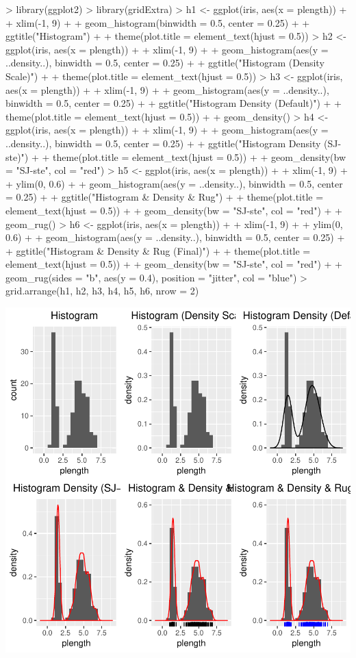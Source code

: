 \begin{Schunk}
\begin{Sinput}
> library(ggplot2)
> library(gridExtra)
> h1 <- ggplot(iris, aes(x = plength)) +
+   xlim(-1, 9) +
+   geom_histogram(binwidth = 0.5, center = 0.25) +
+   ggtitle("Histogram") +
+   theme(plot.title = element_text(hjust = 0.5))
> h2 <- ggplot(iris, aes(x = plength)) +
+   xlim(-1, 9) +
+   geom_histogram(aes(y = ..density..), binwidth = 0.5, center = 0.25) +
+   ggtitle("Histogram (Density Scale)") +
+   theme(plot.title = element_text(hjust = 0.5))
> h3 <- ggplot(iris, aes(x = plength)) +
+   xlim(-1, 9) +
+   geom_histogram(aes(y = ..density..), binwidth = 0.5, center = 0.25) +
+   ggtitle("Histogram Density (Default)") +
+   theme(plot.title = element_text(hjust = 0.5)) +
+   geom_density()
> h4 <- ggplot(iris, aes(x = plength)) +
+   xlim(-1, 9) +
+   geom_histogram(aes(y = ..density..), binwidth = 0.5, center = 0.25) +
+   ggtitle("Histogram Density (SJ-ste)") +
+   theme(plot.title = element_text(hjust = 0.5)) +
+   geom_density(bw = "SJ-ste", col = "red")
> h5 <- ggplot(iris, aes(x = plength)) +
+   xlim(-1, 9) +
+   ylim(0, 0.6) +
+   geom_histogram(aes(y = ..density..), binwidth = 0.5, center = 0.25) +
+   ggtitle("Histogram & Density & Rug") +
+   theme(plot.title = element_text(hjust = 0.5)) +
+   geom_density(bw = "SJ-ste", col = "red") +
+   geom_rug()
> h6 <- ggplot(iris, aes(x = plength)) +
+   xlim(-1, 9) +
+   ylim(0, 0.6) +
+   geom_histogram(aes(y = ..density..), binwidth = 0.5, center = 0.25) +
+   ggtitle("Histogram & Density & Rug (Final)") +
+   theme(plot.title = element_text(hjust = 0.5)) +
+   geom_density(bw = "SJ-ste", col = "red") +
+   geom_rug(sides = "b", aes(y = 0.4), position = "jitter", col = "blue")
> grid.arrange(h1, h2, h3, h4, h5, h6, nrow = 2)
\end{Sinput}
\end{Schunk}
\includegraphics{lect_chapter5_v2-030}


